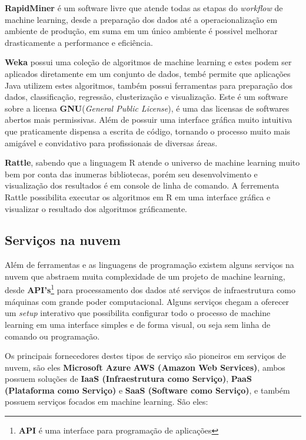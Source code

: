 \begin{alineas}
	\item \textbf{RapidMiner} é um software livre que atende todas as etapas do \textit{workflow} de machine learning, desde a preparação dos dados até 
	a operacionalização em ambiente de produção, em suma em um único ambiente é possivel melhorar drasticamente a performance e eficiência.

	\item \textbf{Weka} possui uma coleção de algoritmos de machine learning e estes podem ser aplicados diretamente em um conjunto de dados, tembé permite
	que aplicações Java utilizem estes algoritmos, também possui ferramentas para preparação dos dados, classificação, regressão, clusterização e visualização.
	Este é um software sobre a licensa \textbf{GNU}(\textit{General Public License}), é uma das licensas de softwares abertos mais permissivas. 
	Além de possuir uma interface gráfica muito intuitiva que praticamente dispensa a escrita de código, tornando o processo muito mais amigável e
	convidativo para profissionais de diversas áreas.

	\item \textbf{Rattle}, sabendo que a linguagem R atende o universo de machine learning muito bem por conta das inumeras bibliotecas, porém 
	seu desenvolvimento e visualização dos resultados é em console de linha de comando. A ferrementa Rattle possibilita executar os algoritmos
	em R em uma interface gráfica e visualizar o resultado dos algoritmos gráficamente.	  
\end{alineas}


\subsection{Serviços na nuvem}
\label{subsec:servicos}
Além de ferramentas e as linguagens de programação existem alguns serviços na nuvem que abstraem muita complexidade de um projeto de machine learning, 
desde \textbf{API's}\footnote{\textbf{API} é uma interface para programação de aplicações} para processamento dos dados até serviços de infraestrutura como máquinas com grande poder computacional.
Alguns serviços chegam a oferecer um \textit{setup} interativo que possibilita configurar todo o processo de machine learning em uma interface
simples e de forma visual, ou seja sem linha de comando ou programação.


Os principais fornecedores destes tipos de serviço são pioneiros em serviços de nuvem, são eles \textbf{Microsoft Azure} \textbf{AWS (Amazon Web Services)}, 
ambos possuem soluções de \textbf{IaaS (Infraestrutura como Serviço)}, \textbf{PaaS (Plataforma como Serviço)} e \textbf{SaaS (Software como Serviço)}, e também
possuem serviços focados em machine learning. São eles:


